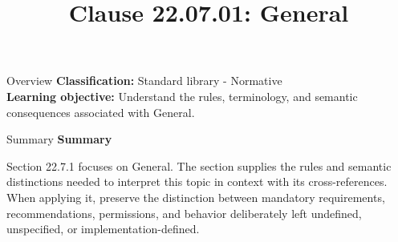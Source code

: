 \documentclass[10pt,letterpaper]{article}
\title{Clause 22.07.01: General}
\author{}
\date{}
\begin{document}
\maketitle
\begin{CornellOverviewBox}{Overview}
\textbf{Classification:} Standard library - Normative\\[2pt]
\textbf{Learning objective:} Understand the rules, terminology, and semantic consequences associated with General.
\end{CornellOverviewBox}\begin{CornellSummaryBox}{Summary}
{\sffamily\bfseries\color{Accent} Summary}\par\vspace{3pt}Section 22.7.1 focuses on General. The section supplies the rules and semantic distinctions needed to interpret this topic in context with its cross-references. When applying it, preserve the distinction between mandatory requirements, recommendations, permissions, and behavior deliberately left undefined, unspecified, or implementation-defined.
\end{CornellSummaryBox}
\end{document}
